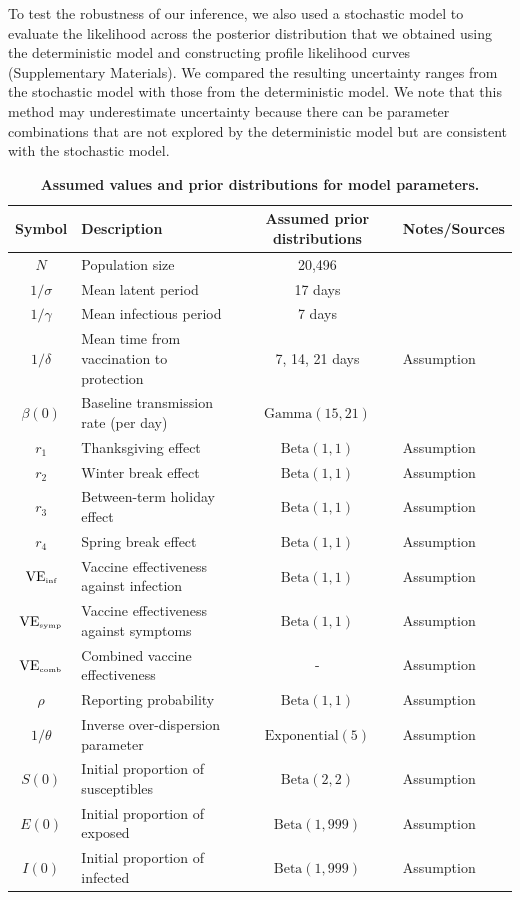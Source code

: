 \documentclass[12pt]{article}
\begin{document}
To test the robustness of our inference, we also used a stochastic model to evaluate the likelihood across the posterior distribution that we obtained using the deterministic model and constructing profile likelihood curves (Supplementary Materials).
We compared the resulting uncertainty ranges from the stochastic model with those from the deterministic model.
We note that this method may underestimate uncertainty because there can be parameter combinations that are not explored by the deterministic model but are consistent with the stochastic model.

\begin{table}[!t]
\begin{center}
\scriptsize
\begin{tabular}{c|p{6cm}|c|l}
Symbol & Description & Assumed prior distributions & Notes/Sources\\
\hline
$N$ & Population size & 20,496 & \citep{cardemil2017effectiveness} \\
$1/\sigma$ & Mean latent period & 17 days & \cite{galazka1999mumps,lewnard2018vaccine} \\
$1/\gamma$ & Mean infectious period & 7 days & \cite{galazka1999mumps,lewnard2018vaccine} \\
$1/\delta$ & Mean time from vaccination to protection & 7, 14, 21 days & Assumption \\
$\beta(0)$ & Baseline transmission rate (per day) & $\textrm{Gamma}(15, 21)$ & \cite{lewnard2018vaccine} \\
$r_1$ & Thanksgiving effect & $\textrm{Beta}(1, 1)$ & Assumption \\
$r_2$ & Winter break effect & $\textrm{Beta}(1, 1)$ & Assumption \\
$r_3$ & Between-term holiday effect & $\textrm{Beta}(1, 1)$ & Assumption \\
$r_4$ & Spring break effect & $\textrm{Beta}(1, 1)$ & Assumption \\
$\mathrm{VE}_{\textrm{\tiny{inf}}}$ & Vaccine effectiveness against infection & $\textrm{Beta}(1, 1)$ & Assumption \\
$\mathrm{VE}_{\textrm{\tiny{symp}}}$ & Vaccine effectiveness against symptoms & $\textrm{Beta}(1, 1)$ & Assumption \\
$\mathrm{VE}_{\textrm{\tiny{comb}}}$ & Combined vaccine effectiveness & - & Assumption \\
$\rho$ & Reporting probability & $\textrm{Beta}(1, 1)$ & Assumption \\
$1/\theta$ & Inverse over-dispersion parameter & $\textrm{Exponential}(5)$ & Assumption \\
$S(0)$ & Initial proportion of susceptibles & $\textrm{Beta}(2, 2)$ & Assumption \\
$E(0)$ & Initial proportion of exposed & $\textrm{Beta}(1, 999)$ & Assumption \\
$I(0)$ & Initial proportion of infected & $\textrm{Beta}(1, 999)$ & Assumption \\
\hline
\end{tabular}
\caption{
\textbf{Assumed values and prior distributions for model parameters.}
}
\end{center}
\end{table}
\end{document}

